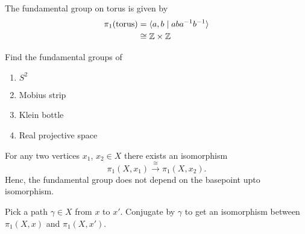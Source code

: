     \begin{ex}
      The fundamental group on torus is given by
      \begin{align*}
        \pi_1(\mbox{torus})
        &= \langle a, b \mid a b a^{-1} b^{-1} \rangle \\
        &\cong \mathbb{Z} \times \mathbb{Z}
      \end{align*}
    \end{ex}

  \begin{qbox}
    Find the fundamental groups of
    \begin{enumerate}
      \item $S^2$
      \item Mobius strip
      \item Klein bottle
      \item Real projective space
    \end{enumerate}
  \end{qbox}

  \begin{proposition}
    For any two vertices $x_1$, $x_2 \in X$ there exists an isomorphism
    \begin{equation*}
      \pi_1(X,x_1) \xrightarrow{\cong} \pi_1(X,x_2).
    \end{equation*}
  Henc, the fundamental group does not depend on the basepoint upto isomorphism.
\end{proposition}
  \begin{qbox}
    Pick a path $\gamma \in X$ from $x$ to $x'$.
    Conjugate by $\gamma$ to get an isomorphism between $\pi_1(X,x)$ and $\pi_1(X,x')$.
  \end{qbox}

